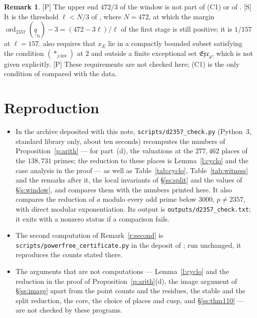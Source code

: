 \documentclass[11pt,a4paper]{article}
\newcommand{\ord}{\operatorname{ord}}
\newcommand{\qq}{\underline{\underline{q}}}
\newcommand{\tS}{\textup{[S]}}
\newcommand{\tP}{\textup{[P]}}
\theoremstyle{plain}
\theoremstyle{definition}
\newtheorem{remark}[theorem]{Remark}
\begin{document}
\begin{remark}\label{r:window}
\tP{} The upper end $472/3$ of the window is not part of (C1) or of \cite[Def.~3.1]{IUT1}. \tS{} It is the threshold
$\ell<N/3$ of \cite[\S\S8,13]{Second}, where $N=472$, at which the margin $\ord_{2357}(\qq_{\mathrm b})-3=(472-3\ell)/\ell$
of the first stage is still positive; it is $1/157$ at $\ell=157$. \cite[Cor.~2.2]{IUT4} also requires that $x_E$ lie in
a compactly bounded subset satisfying the condition $(\ast_{j\text{-inv}})$ at $2$ and outside a finite exceptional set
$\mathfrak{Exc}_d$, which is not given explicitly. \tP{} These requirements are not checked here; (C1) is the only condition
of \cite[Cor.~2.2]{IUT4} compared with the data.
\end{remark}

\section{Reproduction}\label{s:repro}

\begin{itemize}
\item In the archive deposited with this note, \texttt{scripts/d2357\_check.py} (Python~3, standard library only,
 about ten seconds) recomputes the numbers of Proposition~\ref{p:arith} --- for part~(d), the valuations at the
 $277{,}462$ places of the $138{,}731$ primes; the reduction to these places is Lemma~\ref{l:cyclo} and the case
 analysis in the proof --- as well as Table~\ref{tab:cyclo}, Table~\ref{tab:witness} and the remarks after it, the local
 invariants of \S\ref{ss:split} and the values of \S\ref{s:window}, and compares them with the numbers printed here. It
 also compares the reduction of $a$ modulo every odd prime below $3000$, $p\ne2357$, with direct modular
 exponentiation. Its output is \texttt{outputs/d2357\_check.txt}; it exits with a nonzero status if a comparison
 fails.
\item The second computation of Remark~\ref{r:second} is \texttt{scripts/powerfree\_certificate.py} in the deposit of
 \cite{Second}; run unchanged, it reproduces the counts stated there.
\item The arguments that are not computations --- Lemma~\ref{l:cyclo} and the reduction in the proof of
 Proposition~\ref{p:arith}(d), the image argument of \S\ref{ss:image} apart from the point counts and the residues, the
 stable and the split reduction, the core, the choice of places and cusp, and \S\ref{ss:thm110} --- are not checked by
 these programs.
\end{itemize}
\end{document}
